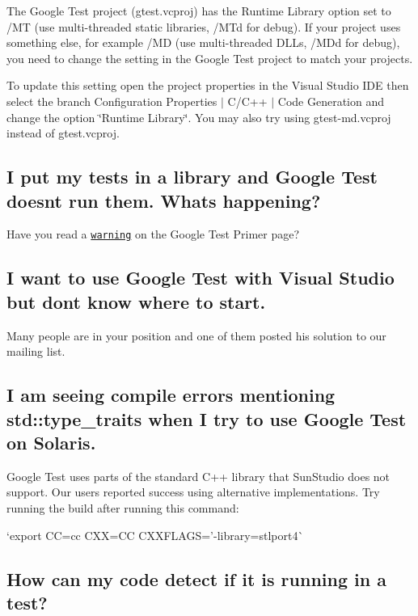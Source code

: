 The Google Test project (gtest.\+vcproj) has the Runtime Library option set to /\+MT (use multi-\/threaded static libraries, /\+M\+Td for debug). If your project uses something else, for example /\+MD (use multi-\/threaded D\+L\+Ls, /\+M\+Dd for debug), you need to change the setting in the Google Test project to match your project\textquotesingle{}s.

To update this setting open the project properties in the Visual Studio I\+DE then select the branch Configuration Properties $\vert$ C/C++ $\vert$ Code Generation and change the option \char`\"{}\+Runtime Library\char`\"{}. You may also try using gtest-\/md.\+vcproj instead of gtest.\+vcproj.

\subsection*{I put my tests in a library and Google Test doesn\textquotesingle{}t run them. What\textquotesingle{}s happening?}

Have you read a \href{primer.md#important-note-for-visual-c-users}{\tt warning} on the Google Test Primer page?

\subsection*{I want to use Google Test with Visual Studio but don\textquotesingle{}t know where to start.}

Many people are in your position and one of them posted his solution to our mailing list.

\subsection*{I am seeing compile errors mentioning std\+::type\+\_\+traits when I try to use Google Test on Solaris.}

Google Test uses parts of the standard C++ library that Sun\+Studio does not support. Our users reported success using alternative implementations. Try running the build after running this command\+:

`export CC=cc C\+XX=CC C\+X\+X\+F\+L\+A\+GS='-\/library=stlport4\textquotesingle{}\`{}

\subsection*{How can my code detect if it is running in a test?}

